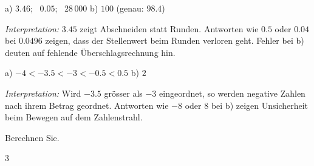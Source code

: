 \documentclass[11pt]{exam}
\newcommand{\aufgabe}[1]{%
  \needspace{8\baselineskip}%
  \renewcommand{\questionlabel}{\textbf{#1}}%
  \question}
\newcommand{\raum}[1]{\ifprintanswers\else\fillwithgrid{#1}\fi}
\newcommand{\wahl}[1]{\mbox{$\Box$\,#1}}
\newcommand{\wahlr}[1]{\mbox{\ifprintanswers$\blacksquare$\,\textbf{#1}\else$\Box$\,#1\fi}}
\newcommand{\diagnose}[1]{\par\smallskip\textit{Interpretation:} #1}
\begin{document}
\begin{questions}
\begin{solution}
  a) $3.46$; \ $0.05$; \ $28\,000$ \qquad b) $100$ (genau: $98.4$)
  \diagnose{$3.45$ zeigt Abschneiden statt Runden. Antworten wie $0.5$ oder
  $0.04$ bei $0.0496$ zeigen, dass der Stellenwert beim Runden verloren geht.
  Fehler bei b) deuten auf fehlende Überschlagsrechnung hin.}
\end{solution}
\raum{3cm}

\aufgabe{1.4}
\begin{solution}
  a) $-4 < -3.5 < -3 < -0.5 < 0.5$ \qquad b) $2$
  \diagnose{Wird $-3.5$ grösser als $-3$ eingeordnet, so werden negative Zahlen
  nach ihrem Betrag geordnet. Antworten wie $-8$ oder $8$ bei b) zeigen
  Unsicherheit beim Bewegen auf dem Zahlenstrahl.}
\end{solution}
\raum{2.5cm}

\aufgabe{2.3}
Berechnen Sie.
\begin{multicols}{3}
\begin{parts}

\end{parts}
\end{multicols}
\end{questions}
\end{document}
